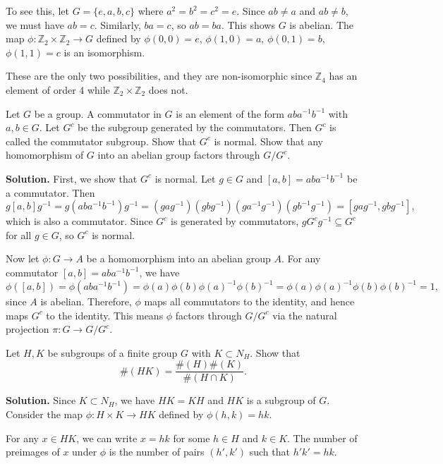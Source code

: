 To see this, let $G = \{e, a, b, c\}$ where $a^2 = b^2 = c^2 = e$. Since $ab \neq a$ and $ab \neq b$, we must have $ab = c$. Similarly, $ba = c$, so $ab = ba$. This shows $G$ is abelian. The map $\phi: \mathbb{Z}_2 \times \mathbb{Z}_2 \to G$ defined by $\phi(0,0) = e$, $\phi(1,0) = a$, $\phi(0,1) = b$, $\phi(1,1) = c$ is an isomorphism.

These are the only two possibilities, and they are non-isomorphic since $\mathbb{Z}_4$ has an element of order 4 while $\mathbb{Z}_2 \times \mathbb{Z}_2$ does not.

\begin{problembox}
Let $G$ be a group. A commutator in $G$ is an element of the form $aba^{-1}b^{-1}$ with $a, b \in G$. Let $G^c$ be the subgroup generated by the commutators. Then $G^c$ is called the commutator subgroup. Show that $G^c$ is normal. Show that any homomorphism of $G$ into an abelian group factors through $G/G^c$.
\end{problembox}

\noindent\textbf{Solution.} First, we show that $G^c$ is normal. Let $g \in G$ and $[a,b] = aba^{-1}b^{-1}$ be a commutator. Then
\[g[a,b]g^{-1} = g(aba^{-1}b^{-1})g^{-1} = (gag^{-1})(gbg^{-1})(ga^{-1}g^{-1})(gb^{-1}g^{-1}) = [gag^{-1}, gbg^{-1}],\]
which is also a commutator. Since $G^c$ is generated by commutators, $gG^cg^{-1} \subseteq G^c$ for all $g \in G$, so $G^c$ is normal.

Now let $\phi: G \to A$ be a homomorphism into an abelian group $A$. For any commutator $[a,b] = aba^{-1}b^{-1}$, we have
\[\phi([a,b]) = \phi(aba^{-1}b^{-1}) = \phi(a)\phi(b)\phi(a)^{-1}\phi(b)^{-1} = \phi(a)\phi(a)^{-1}\phi(b)\phi(b)^{-1} = 1,\]
since $A$ is abelian. Therefore, $\phi$ maps all commutators to the identity, and hence maps $G^c$ to the identity. This means $\phi$ factors through $G/G^c$ via the natural projection $\pi: G \to G/G^c$.

\begin{problembox}
Let $H, K$ be subgroups of a finite group $G$ with $K \subset N_H$. Show that
\[\#(HK) = \frac{\#(H)\#(K)}{\#(H \cap K)}.\]
\end{problembox}

\noindent\textbf{Solution.} Since $K \subset N_H$, we have $HK = KH$ and $HK$ is a subgroup of $G$. Consider the map $\phi: H \times K \to HK$ defined by $\phi(h,k) = hk$.

For any $x \in HK$, we can write $x = hk$ for some $h \in H$ and $k \in K$. The number of preimages of $x$ under $\phi$ is the number of pairs $(h',k')$ such that $h'k' = hk$.

